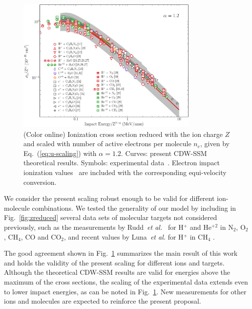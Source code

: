\documentclass[10pt,showpacs,showkeys,twocolumn]{revtex4-1}
\begin{document}
\begin{figure}[!htb]
\centering
\includegraphics[width=0.8\textwidth]{zmol_werror-wref.eps}
\caption{(Color online) Ionization cross section reduced with the ion
charge $Z$ and scaled with number of active electrons per molecule $n_e$,
given by Eq.~(\ref{eq:u-scaling}) with $\alpha=1.2$. 
Curves: present CDW-SSM theoretical results. 
Symbols: experimental data~\cite{itoh2013,iriki2011,wolff2014,wang2016,
tribedi2019,Luna2007,Rudd86,pRudd85,toburen80,Ohsawa05,Bhattacharjee17,
DalCappello2009,Tribedi_O_water,Rudd85,Luna2019,Rudd1983}. Electron 
impact ionization values~\cite{rahman2016,bug2017,wolf2019,fuss2009} 
are included with the corresponding equi-velocity conversion.}
\label{fig:zalpha}
\end{figure} 

We consider the present scaling robust enough to be valid for different 
ion-molecule combinations. We tested the generality of our model 
by including in Fig.~\ref{fig:zreduced} several data sets of 
molecular targets not considered previously, such as the measurements 
by Rudd~\textit{et al.}~\cite{Rudd85,Rudd1983} for H$^{+}$ and He$^{+2}$ 
in N$_2$, O$_2$, CH$_4$, CO and CO$_2$, and recent values by 
Luna~\textit{et al.} \cite{Luna2019} for H$^{+}$ in CH$_4$ . 

The good agreement shown in Fig.~\ref{fig:zalpha} summarizes the main 
result of this work and holds the validity of the present scaling for 
different ions and targets. Although the theoretical CDW-SSM results 
are valid for energies above the maximum of the cross sections, the 
scaling of the experimental data extends even to lower impact energies, 
as can be noted in Fig.~\ref{fig:zalpha}. New measurements for other 
ions and molecules are expected to reinforce the present proposal. 
\end{document}
